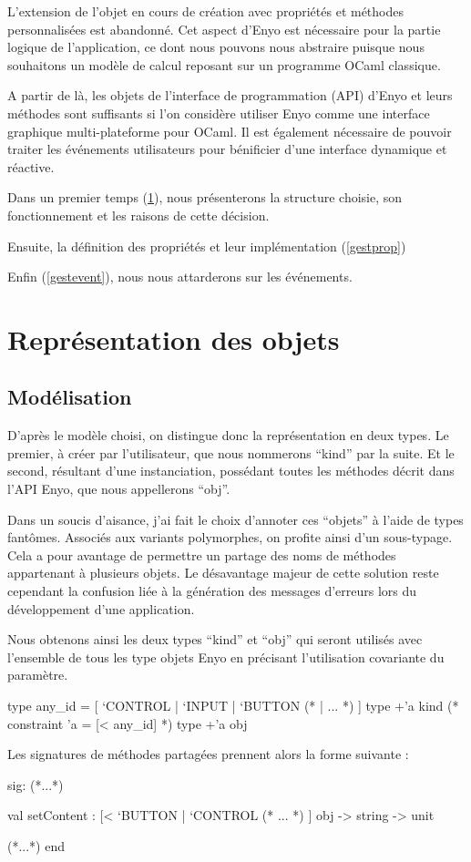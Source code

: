 \documentclass[11pt,a4paper]{report}
\begin{document}
L'extension de l'objet en cours de création avec propriétés et méthodes personnalisées est 
abandonné. Cet aspect d'Enyo est nécessaire pour la partie logique de l'application, ce dont 
nous pouvons nous abstraire puisque nous souhaitons un modèle de calcul reposant sur 
un programme OCaml classique.

A partir de là, les objets de l'interface de programmation (API) d'Enyo et leurs méthodes 
sont suffisants si l'on considère utiliser Enyo comme une interface graphique multi-plateforme
pour OCaml. Il est également nécessaire de pouvoir traiter les événements utilisateurs pour bénificier 
d'une interface dynamique et réactive.

Dans un premier temps (\ref{repobj}), nous présenterons la structure choisie, son fonctionnement et les raisons
de cette décision.

Ensuite, la définition des propriétés et leur implémentation (\ref{gestprop})

Enfin (\ref{gestevent}), nous nous attarderons sur les événements.

\section{Représentation des objets}\label{repobj}
\subsection{Modélisation}
D'après le modèle choisi, on distingue donc la représentation en deux types. Le premier,
à créer par l'utilisateur, que nous nommerons ``kind'' par la suite. Et le second,
résultant d'une instanciation, possédant toutes les méthodes décrit dans l'API Enyo, que
nous appellerons ``obj''.

Dans un soucis d'aisance, j'ai fait le choix d'annoter ces ``objets'' à l'aide de types fantômes.
Associés aux variants polymorphes, on profite ainsi d'un sous-typage.
Cela a pour avantage de permettre un partage des noms de méthodes appartenant à plusieurs objets. 
Le désavantage majeur de cette solution reste cependant la confusion liée 
à la génération des messages d'erreurs lors du développement d'une application.

Nous obtenons ainsi les deux types ``kind'' et ``obj'' qui seront utilisés avec l'ensemble de tous 
les type objets Enyo en précisant l'utilisation covariante du paramètre.
\begin{OCaml}
  type any_id = 
        [ `CONTROL | `INPUT | `BUTTON (* | ... *) ]
  type +'a kind (* constraint 'a = [< any_id] *)
  type +'a obj
\end{OCaml}
Les signatures de méthodes partagées prennent alors la forme suivante :
\begin{OCaml}
  sig:
  (*...*)
  
     val setContent : 
         [< `BUTTON | `CONTROL (* ... *) ] obj 
         -> string 
         -> unit
  
  (*...*)
  end
\end{OCaml}
\end{document}
